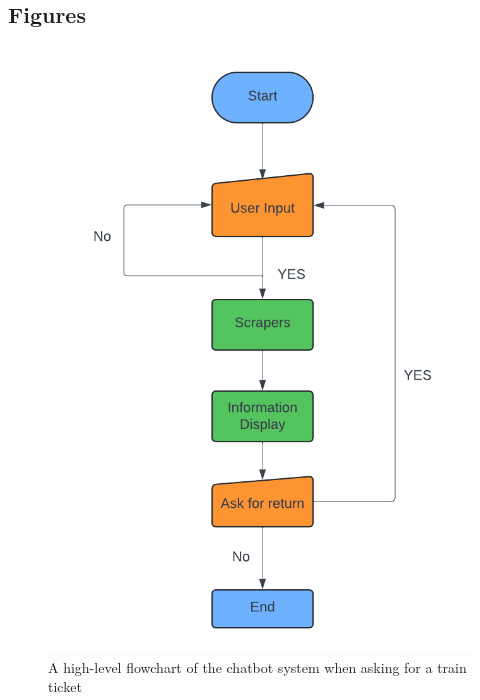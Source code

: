 \newpage
\subsection{Figures}
\begin{figure}[!htbp]
    \centering
    \includegraphics[width=0.8\linewidth]{Diagrams/Flowcharts.png}
    \caption{A high-level flowchart of the chatbot system when asking for a train ticket}
    \label{Fig: Flowchart}
\end{figure}
